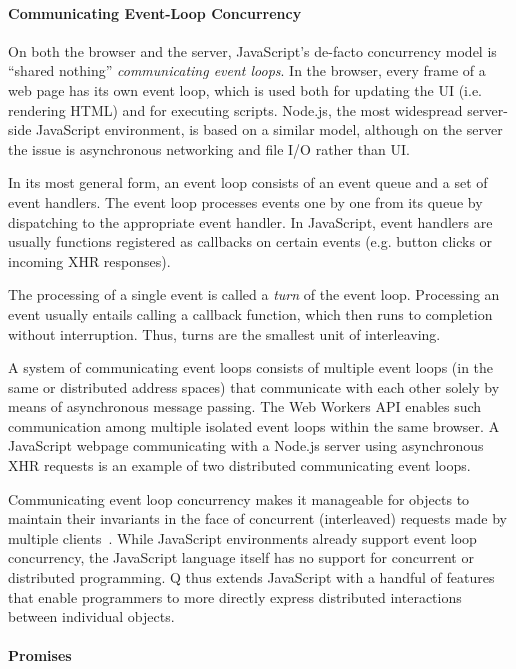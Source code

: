 \documentclass{llncs}
\begin{document}
\paragraph{Communicating Event-Loop Concurrency}

On both the browser and the server, JavaScript's de-facto concurrency model is ``shared nothing'' \emph{communicating event loops}. In the browser, every frame of a web page has its own event loop, which is used both for updating the UI (i.e. rendering HTML) and for executing scripts. Node.js, the most widespread server-side JavaScript environment, is based on a similar model, although on the server the issue is asynchronous networking and file I/O rather than UI.

In its most general form, an event loop consists of an event queue and a set of event handlers. The event loop processes events one by one from its queue by dispatching to the appropriate event handler. In JavaScript, event handlers are usually functions registered as callbacks on certain events (e.g. button clicks or incoming XHR responses).

The processing of a single event is called a \emph{turn} of the event loop. Processing an event usually entails calling a callback function, which then runs to completion without interruption. Thus, turns are the smallest unit of interleaving.

A system of communicating event loops consists of multiple event loops (in the same or distributed address spaces) that communicate with each other solely by means of asynchronous message passing. The Web Workers API enables such communication among multiple isolated event loops within the same browser. A JavaScript webpage communicating with a Node.js server using asynchronous XHR requests is an example of two distributed communicating event loops.

Communicating event loop concurrency makes it manageable for objects to maintain their invariants in the face of concurrent (interleaved) requests made by multiple clients~\cite{miller:strangers}. While JavaScript environments already support event loop concurrency, the JavaScript language itself has no support for concurrent or distributed programming. Q thus extends JavaScript with a handful of features that enable programmers to more directly express distributed interactions between individual objects.

\paragraph{Promises}
\end{document}
